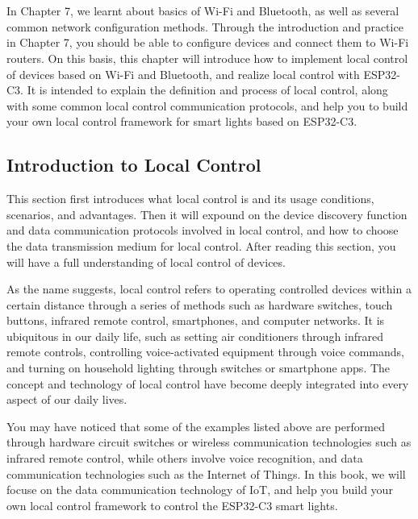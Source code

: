 \documentclass[a4paper,12pt]{book}
\begin{document}

\chapter[Local Control]{}

\vspace{36pt}
In Chapter 7, we learnt about basics of Wi-Fi and Bluetooth, as well as several common network configuration methods. Through the introduction and practice in Chapter 7, you should be able to configure devices and connect them to Wi-Fi routers. On this basis, this chapter will introduce how to implement local control of devices based on Wi-Fi and Bluetooth, and realize local control with ESP32-C3. It is intended to explain the definition and process of local control, along with some common local control communication protocols, and help you to build your own local control framework for smart lights based on ESP32-C3.

\section{Introduction to Local Control}
This section first introduces what local control is and its usage conditions, scenarios, and advantages. Then it will expound on the device discovery function and data communication protocols involved in local control, and how to choose the data transmission medium for local control. After reading this section, you will have a full understanding of local control of devices.

As the name suggests, local control refers to operating controlled devices within a certain distance through a series of methods such as hardware switches, touch buttons, infrared remote control, smartphones, and computer networks. It is ubiquitous in our daily life, such as setting air conditioners through infrared remote controls, controlling voice-activated equipment through voice commands, and turning on household lighting through switches or smartphone apps. The concept and technology of local control have become deeply integrated into every aspect of our daily lives.

You may have noticed that some of the examples listed above are performed through hardware circuit switches or wireless communication technologies such as infrared remote control, while others involve voice recognition, and data communication technologies such as the Internet of Things. In this book, we will focuse on the data communication technology of IoT, and help you build your own local control framework to control the ESP32-C3 smart lights.
\end{document}
